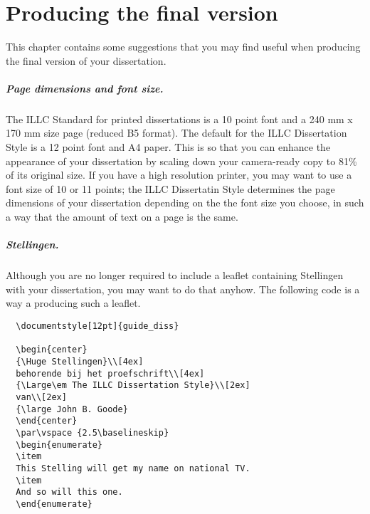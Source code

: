 
\chapter{Producing the final version}
This chapter contains some suggestions that you may find useful 
when producing the final version of your dissertation.

\paragraph*{Page dimensions and font size.}
The ILLC Standard for printed dissertations is a
10 point font and a 240 mm x 170 mm size page (reduced B5 format).
The default for the ILLC Dissertation Style is a 12 point font and A4 paper.
This is so that you can enhance the appearance of your dissertation
by scaling down your camera-ready copy to 81\% of its original size.
If you have a high resolution printer, you may want to use a font size
of 10 or 11 points; 
the ILLC Dissertatin Style determines the page dimensions of your dissertation 
depending on the the font size you choose, in such a way that the amount of
text on a page is the same.

\paragraph*{Stellingen.}
Although you are no longer required to include a leaflet containing
Stellingen with your dissertation, you may want to do that anyhow.
The following code is a way a producing such a leaflet.
\begin{verbatim}
  \documentstyle[12pt]{guide_diss}
  
  \begin{center}
  {\Huge Stellingen}\\[4ex]
  behorende bij het proefschrift\\[4ex]
  {\Large\em The ILLC Dissertation Style}\\[2ex]
  van\\[2ex]
  {\large John B. Goode}
  \end{center}
  \par\vspace {2.5\baselineskip}
  \begin{enumerate}
  \item 
  This Stelling will get my name on national TV.
  \item
  And so will this one.
  \end{enumerate}
\end{verbatim}


